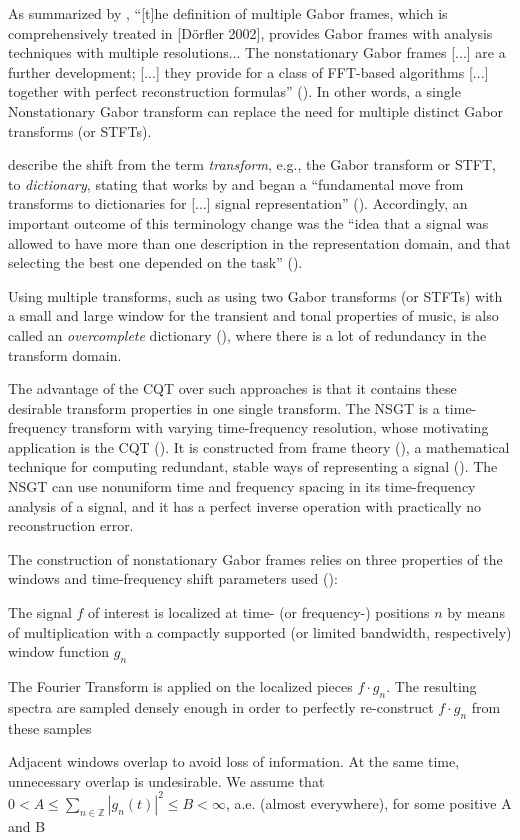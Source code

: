 \documentclass[report.tex]{subfiles}
\begin{document}
As summarized by \citeauthor{adaptivecqt}, ``[t]he definition of multiple Gabor frames, which is comprehensively treated in [D{\"o}rfler 2002], provides Gabor frames with analysis techniques with multiple resolutions... The nonstationary Gabor frames [...] are a further development; [...] they provide for a class of FFT-based algorithms [...] together with perfect reconstruction formulas'' (\cite[2]{adaptivecqt}). In other words, a single Nonstationary Gabor transform can replace the need for multiple distinct Gabor transforms (or STFTs).

\citeauthor{dictionary} describe the shift from the term \textit{transform}, e.g., the Gabor transform or STFT, to \textit{dictionary}, stating that works by \cite{dictionary1} and \cite{dictionary2} began a ``fundamental move from transforms to dictionaries for [...] signal representation'' (\cite[1,049]{dictionary}). Accordingly, an important outcome of this terminology change was the ``idea that a signal was allowed to have more than one description in the representation domain, and that selecting the best one depended on the task'' (\cite[1,049]{dictionary}).

Using multiple transforms, such as using two Gabor transforms (or STFTs) with a small and large window for the transient and tonal properties of music, is also called an \textit{overcomplete} dictionary (\cite{dictionary}), where there is a lot of redundancy in the transform domain.

The advantage of the CQT over such approaches is that it contains these desirable transform properties in one single transform. The NSGT is a time-frequency transform with varying time-frequency resolution, whose motivating application is the CQT (\cite{jaillet, balazs}). It is constructed from frame theory (\cite{frametheory}), a mathematical technique for computing redundant, stable ways of representing a signal (\cite{framesintro}). The NSGT can use nonuniform time and frequency spacing in its time-frequency analysis of a signal, and it has a perfect inverse operation with practically no reconstruction error.

The construction of nonstationary Gabor frames relies on three properties of the windows and time-frequency shift parameters used (\cite[2]{balazs}):
\begin{tight_itemize}
	\item
		The signal $f$ of interest is localized at time- (or frequency-) positions $n$ by means of multiplication with a compactly supported (or limited bandwidth, respectively) window function $g_{n}$
	\item
		The Fourier Transform is applied on the localized pieces $f \cdot g_{n}$. The resulting spectra are sampled densely enough in order to perfectly re-construct $f \cdot g_{n}$ from these samples
	\item
		Adjacent windows overlap to avoid loss of information. At the same time, unnecessary overlap is undesirable. We assume that $0 < A \le \sum_{n \in \mathbb{Z}}|g_{n}(t)|^{2} \le B < \infty$, a.e. (almost everywhere), for some positive A and B
\end{tight_itemize}
\end{document}
